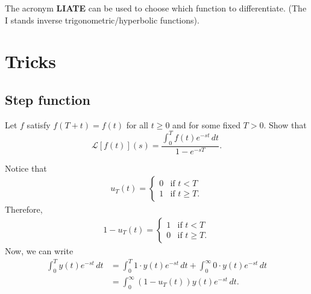 \documentclass[12pt, a4paper]{article}
\newcommand{\CL}{\mathcal{L}}
\begin{document}
\begin{mdnote}
    The acronym \textbf{LIATE} can be used to choose which function to differentiate. (The I stands inverse trigonometric/hyperbolic functions).
\end{mdnote}

\section{Tricks}

\subsection{Step function}

\begin{example}
    Let \(f\) satisfy \(f(T+t) =f(t)\) for all \(t \geq 0\) and for some fixed \(T>0\). Show that 
    \[\CL[f(t)](s) = \frac{\int_{0}^{T} f(t) e^{-st}\, dt}{1-e^{-sT}}.\]
    \begin{solution}
        Notice that 
        \[\begin{aligned}
            u_T(t) = \begin{cases}
                0 &\text{if } t < T\\
                1 &\text{if } t \geq T.
            \end{cases}
        \end{aligned}\]
        Therefore, 
        \[\begin{aligned}
            1- u_T(t) = \begin{cases}
                1 &\text{if } t < T\\
                0 &\text{if } t \geq T.
            \end{cases}
        \end{aligned}\]
        Now, we can write 
        \[\begin{aligned}
            \int_{0}^{T} y(t)e^{-st} \, dt &= \int_{0}^{T} 1 \cdot y(t)e^{-st} \, dt + \int_{0}^{\infty} 0 \cdot y(t)e^{-st} \, dt \\
            &= \int_{0}^{\infty} (1-u_T(t)) y(t)e^{-st} \, dt.
        \end{aligned}\]
    \end{solution}
\end{example}
\end{document}
